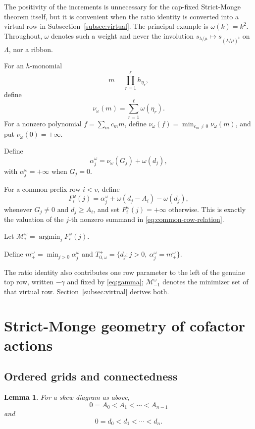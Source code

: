 \documentclass[11pt,a4paper]{amsart}
\numberwithin{equation}{section}
\theoremstyle{plain}
\newtheorem{lemma}[theorem]{Lemma}
\theoremstyle{definition}
\DeclareMathOperator{\argmin}{argmin}
\newcommand{\Lam}{\Lambda}
\newcommand{\wto}{\nu_{\omega}}
\begin{document}
The positivity of the increments is unnecessary for the cap-fixed Strict-Monge theorem itself, but it is convenient when the ratio identity is converted into a virtual row in Subsection~\ref{subsec:virtual}.  The principal example is \(\omega(k)=k^2\).  Throughout, \(\omega\) denotes such a weight and never the involution \(s_{\lambda/\mu}\mapsto s_{(\lambda/\mu)^{t}}\) on \(\Lam\), nor a ribbon.

For an \(h\)-monomial
\[
m=\prod_{r=1}^{\ell}h_{\eta_r},
\]
define
\[
\wto(m)=\sum_{r=1}^{\ell}\omega(\eta_r).
\]
For a nonzero polynomial \(f=\sum_m c_m m\), define \(\wto(f)=\min_{c_m\ne0}\wto(m)\), and put \(\wto(0)=+\infty\).

Define
\begin{equation}\label{eq:alpha-general}
\alpha_j^{\omega}
=
\wto(G_j)+\omega(d_j),
\end{equation}
with \(\alpha_j^\omega=+\infty\) when \(G_j=0\).

For a common-prefix row \(i<v\), define
\begin{equation}\label{eq:F-general}
F_i^\omega(j)
=
\alpha_j^\omega
+
\omega(d_j-A_i)
-
\omega(d_j),
\end{equation}
whenever \(G_j\ne0\) and \(d_j\ge A_i\), and set \(F_i^\omega(j)=+\infty\) otherwise.  This is exactly the valuation of the \(j\)-th nonzero summand in \eqref{eq:common-row-relation}.

Let \(\mathcal M_i^\omega=\argmin_j F_i^\omega(j)\).

Define \(m_+^\omega=\min_{j>0}\alpha_j^\omega\)
and \(T_{0,\omega}^+=\{d_j:j>0,\ \alpha_j^\omega=m_+^\omega\}\).

The ratio identity also contributes one row parameter to the left of the genuine top row, written \(-\gamma\) and fixed by \eqref{eq:gamma}; \(\mathcal M_{-1}^{\omega}\) denotes the minimizer set of that virtual row.  Section~\ref{subsec:virtual} derives both.

\section{Strict-Monge geometry of cofactor actions}\label{sec:geometry}

\subsection{Ordered grids and connectedness}\label{subsec:setup}

\begin{lemma}\label{lem:grid-order}
For a skew diagram as above,
\[
0=A_0<A_1<\cdots<A_{n-1}
\]
and
\[
0=d_0<d_1<\cdots<d_n.
\]
\end{lemma}
\end{document}
